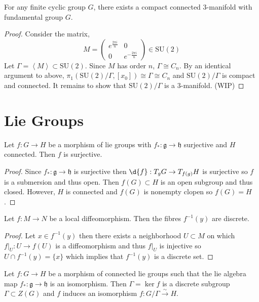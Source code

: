 \documentclass[12pt]{extarticle}
\newcommand{\SU}[1]{\mathrm{SU}(#1)}
\begin{document}
\begin{theorem}
For any finite cyclic group $G$, there exists a compact connected 3-manifold with fundamental group $G$.  
\end{theorem}

\begin{proof}
Consider the matrix,
\[
M = \begin{pmatrix}
e^{\frac{2 \pi i}{n}} & 0 \\
0 & e^{-\frac{2 \pi i}{n}}
\end{pmatrix} \in \SU{2}\]
Let $\Gamma = \left< M \right> \subset \SU{2}$. Since $M$ has order $n$, $\Gamma \cong C_n$. By an identical argument to above, $\pi_1(\SU{2}/\Gamma, [x_0]) \cong \Gamma \cong C_n$ and $\SU{2}/\Gamma$ is compact and connected. It remains to show that $\SU{2}/\Gamma$ is a 3-manifold. (WIP)
\end{proof}

\section{Lie Groups}

\newcommand{\g}{\mathfrak{g}}
\newcommand{\h}{\mathfrak{h}}

\begin{proposition}
Let $f : G \to H$ be a morphism of lie groups with $f_* : \g \to \h$ surjective and $H$ connected. Then $f$ is surjective.
\end{proposition}

\begin{proof}
Since $f_* : \g \to \h$ is surjective then $\d{f} : T_g G \to T_{f(g)} H$ is surjective so $f$ is a submersion and thus open. Then $f(G) \subset H$ is an open subgroup and thus closed. However, $H$ is connected and $f(G)$ is nonempty clopen so $f(G) = H$. 
\end{proof}

\begin{lemma}
Let $f : M \to N$ be a local diffeomorphism. Then the fibres $f^{-1}(y)$ are discrete.
\end{lemma}

\begin{proof}
Let $x \in f^{-1}(y)$ then there exists a neighborhood $U \subset M$ on which $f|_U : U \to f(U)$ is a diffeomorphism and thus $f|_U$ is injective so $U \cap f^{-1}(y) = \{ x \}$ which implies that $f^{-1}(y)$ is a discrete set.
\end{proof}

\begin{proposition}
Let $f : G \to H$ be a morphism of connected lie groups such that the lie algebra map $f_* : \g \to \h$ is an isomorphism. Then $\Gamma = \ker{f}$ is a discrete subgroup $\Gamma \subset Z(G)$ and $f$ induces an isomorphism $f : G / \Gamma \xrightarrow{\sim} H$. 
\end{proposition}
\end{document}
